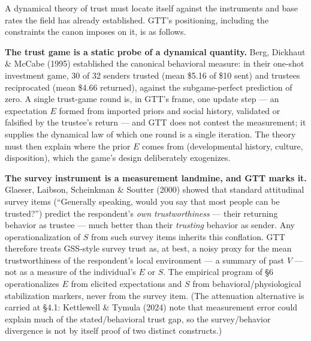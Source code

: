 \documentclass[
]{article}
\begin{document}
A dynamical theory of trust must locate itself against the instruments
and base rates the field has already established. GTT's positioning,
including the constraints the canon imposes on it, is as follows.

\textbf{The trust game is a static probe of a dynamical quantity.} Berg,
Dickhaut \& McCabe (1995) established the canonical behavioral measure:
in their one-shot investment game, 30 of 32 senders trusted (mean \$5.16
of \$10 sent) and trustees reciprocated (mean \$4.66 returned), against
the subgame-perfect prediction of zero. A single trust-game round is, in
GTT's frame, one update step --- an expectation \(E\) formed from
imported priors and social history, validated or falsified by the
trustee's return --- and GTT does not contest the measurement; it
supplies the dynamical law of which one round is a single iteration. The
theory must then explain where the prior \(E\) comes from (developmental
history, culture, disposition), which the game's design deliberately
exogenizes.

\textbf{The survey instrument is a measurement landmine, and GTT marks
it.} Glaeser, Laibson, Scheinkman \& Soutter (2000) showed that standard
attitudinal survey items (``Generally speaking, would you say that most
people can be trusted?'') predict the respondent's \emph{own
trustworthiness} --- their returning behavior as trustee --- much better
than their \emph{trusting} behavior as sender. Any operationalization of
\(S\) from such survey items inherits this conflation. GTT therefore
treats GSS-style survey trust as, at best, a noisy proxy for the mean
trustworthiness of the respondent's local environment --- a summary of
past \(V\) --- not as a measure of the individual's \(E\) or \(S.\) The
empirical program of §6 operationalizes \(E\) from elicited expectations
and \(S\) from behavioral/physiological stabilization markers, never
from the survey item. (The attenuation alternative is carried at §4.1:
Kettlewell \& Tymula (2024) note that measurement error could explain
much of the stated/behavioral trust gap, so the survey/behavior
divergence is not by itself proof of two distinct constructs.)
\end{document}
